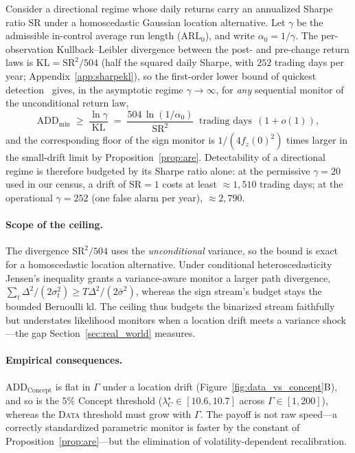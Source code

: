 \documentclass[sigconf,anonymous,review]{acmart}
\theoremstyle{acmdefinition}
\begin{document}
\begin{corollary}\label{cor:sharpe_ceiling}
    Consider a directional regime whose daily returns carry an annualized Sharpe ratio $\mathrm{SR}$ under a homoscedastic Gaussian location alternative. Let $\gamma$ be the admissible in-control average run length ($\mathrm{ARL}_0$), and write $\alpha_0 = 1/\gamma$. The per-observation Kullback--Leibler divergence between the post- and pre-change return laws is $\mathrm{KL} = \mathrm{SR}^2/504$ (half the squared daily Sharpe, with $252$ trading days per year; Appendix~\ref{app:sharpekl}), so the first-order lower bound of quickest detection~\cite{tartakovsky_2014} gives, in the asymptotic regime $\gamma \to \infty$, for \emph{any} sequential monitor of the unconditional return law,
    \[
        \mathrm{ADD}_{\min} \;\ge\; \frac{\ln\gamma}{\mathrm{KL}} \;=\; \frac{504\,\ln(1/\alpha_0)}{\mathrm{SR}^2} \;\;\text{trading days}\;\,(1+o(1)),
    \]
    and the corresponding floor of the sign monitor is $1/(4f_z(0)^2)$ times larger in the small-drift limit by Proposition~\ref{prop:are}. Detectability of a directional regime is therefore budgeted by its Sharpe ratio alone: at the permissive $\gamma = 20$ used in our census, a drift of $\mathrm{SR} = 1$ costs at least ${\approx}1{,}510$ trading days; at the operational $\gamma = 252$ (one false alarm per year), ${\approx}2{,}790$.
\end{corollary}

\paragraph{Scope of the ceiling.} The divergence $\mathrm{SR}^2/504$ uses the \emph{unconditional} variance, so the bound is exact for a homoscedastic location alternative. Under conditional heteroscedasticity Jensen's inequality grants a variance-aware monitor a larger path divergence, $\sum_t \Delta^2/(2\sigma_t^2) \ge T\Delta^2/(2\bar{\sigma}^2)$, whereas the sign stream's budget stays the bounded Bernoulli $\mathrm{kl}$. The ceiling thus budgets the binarized stream faithfully but understates likelihood monitors when a location drift meets a variance shock---the gap Section~\ref{sec:real_world} measures.

\paragraph{Empirical consequences.}
$\mathrm{ADD}_{\mathrm{Concept}}$ is flat in $\Gamma$ under a location drift (Figure~\ref{fig:data_vs_concept}B), and so is the $5\%$ Concept threshold ($\lambda_C^{\star} \in [10.6, 10.7]$ across $\Gamma \in [1, 200]$), whereas the \textsc{Data} threshold must grow with $\Gamma$. The payoff is not raw speed---a correctly standardized parametric monitor is faster by the constant of Proposition~\ref{prop:are}---but the elimination of volatility-dependent recalibration.
\end{document}
